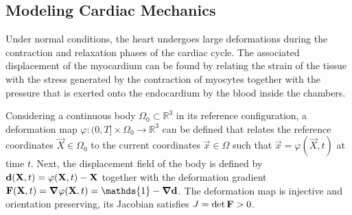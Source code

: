 

\subsection{Modeling Cardiac Mechanics}

Under normal conditions, the heart undergoes large deformations during the contraction and relaxation phases of the cardiac cycle.
The associated displacement of the myocardium can be found by relating the strain of the tissue with the stress generated by the contraction of myocytes together with the pressure that is exerted onto the endocardium by the blood inside the chambers.

Considering a continuous body $\Omega_0 \subset \mathbb{R}^3$ in its reference configuration, a deformation map $\varphi\colon(0,T]\times\Omega_0\rightarrow\mathbb{R}^3$ can be defined that relates the reference coordinates $\vec X \in \Omega_0$ to the current coordinates $\vec x \in \Omega$ such that $\vec x = \varphi(\vec X, t)$ at time $t$.
Next, the displacement field of the body is defined by $\d(\vec X,t) = \varphi(\vec X, t) - \vec X$ together with the deformation gradient $\F(\vec X,t) = \grad{\varphi(\vec X, t)} = \mathds{1} - \grad{\d}$.
The deformation map is injective and orientation preserving, \ie its Jacobian satisfies $J = \det \F > 0$. 

